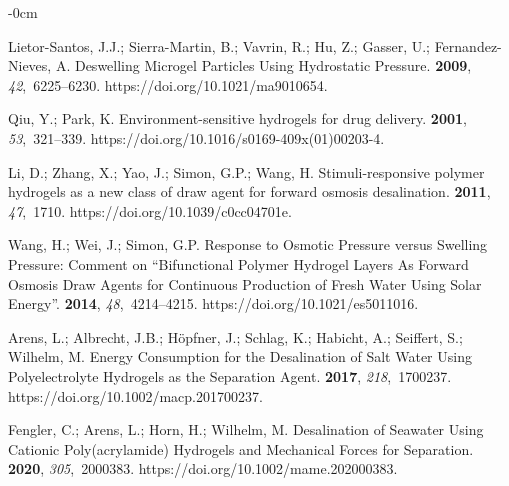 \documentclass[gels,article,accept,pdftex,moreauthors]{Definitions/mdpi}
\begin{document}
\begin{adjustwidth}{-\extralength}{0cm}
\begin{thebibliography}{999}
Lietor-Santos, J.J.; Sierra-Martin, B.; Vavrin, R.; Hu, Z.; Gasser, U.;
  Fernandez-Nieves, A.
\newblock Deswelling Microgel Particles Using Hydrostatic Pressure.
 {\bf 2009}, {\em 42},~6225--6230.
\newblock
  https://doi.org/10.1021/ma9010654.%

Qiu, Y.; Park, K.
\newblock Environment-sensitive hydrogels for drug delivery.
 {\bf 2001}, {\em 53},~321--339.
\newblock
  https://doi.org/10.1016/s0169-409x(01)00203-4.%

Li, D.; Zhang, X.; Yao, J.; Simon, G.P.; Wang, H.
\newblock Stimuli-responsive polymer hydrogels as a new class of draw agent for
  forward osmosis desalination.
 {\bf 2011}, {\em 47},~1710.
\newblock
  https://doi.org/10.1039/c0cc04701e.%

Wang, H.; Wei, J.; Simon, G.P.
\newblock Response to Osmotic Pressure versus Swelling Pressure: Comment on
  {\textquotedblleft}Bifunctional Polymer Hydrogel Layers As Forward Osmosis
  Draw Agents for Continuous Production of Fresh Water Using Solar
  Energy{\textquotedblright}.
 {\bf 2014}, {\em
  48},~4214--4215.
\newblock
  https://doi.org/10.1021/es5011016.%

Arens, L.; Albrecht, J.B.; Höpfner, J.; Schlag, K.; Habicht, A.; Seiffert, S.;
  Wilhelm, M.
\newblock Energy Consumption for the Desalination of Salt Water Using
  Polyelectrolyte Hydrogels as the Separation Agent.
 {\bf 2017}, {\em 218},~1700237.
\newblock
  https://doi.org/10.1002/macp.201700237.%

Fengler, C.; Arens, L.; Horn, H.; Wilhelm, M.
\newblock Desalination of Seawater Using Cationic Poly(acrylamide) Hydrogels
  and Mechanical Forces for Separation.
 {\bf 2020}, {\em 305},~2000383.
\newblock
  https://doi.org/10.1002/mame.202000383.%


\end{thebibliography}
\end{adjustwidth}
\end{document}
